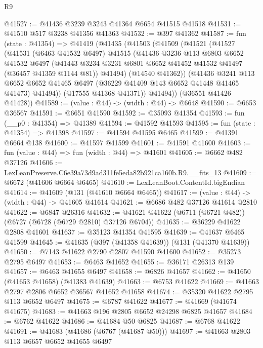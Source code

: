 \begin{lexlean}{R9}
\begin{coremodule}
@41527 := @41436 @3239 @3243 @41364 @6654 @41515 @41518
@41531 := @41510 @517 @3238 @41356 @41363
@41532 := @397 @41362
@41587 := fun (state : @41354) =>
  @41419
    (@41435
      (@41503
        (@41509
          (@41521
            (@41527
              (@41531
                (@6463 @41532 @6497)
                @41515
                (@41436
                  @3236
                  @113
                  @6803
                  @6652
                  @41532
                  @6497
                  (@41443 @3234 @3231 @6801 @6652 @41452 @41532 @41497 (@36457 @41359 @1144 @81))
                  @41494)
                (@14540 @41362))
              (@41436
                @3241
                @113
                @6652
                @6652
                @41465
                @6497
                (@36229 @41409 @143 @6652 @41448 @41465 @41473)
                @41494))
            (@17555 @41368 @41371))
          @41494))
      (@36551 @41426 @41428))
@41589 := (value : @44) -> (width : @44) -> @6648
@41590 := @6653 @36567
@41591 := @6651 @41590
@41592 := @35093 @41354
@41593 := fun (__p0 : @41354) => @41389
@41594 := @41592 @41593
@41595 := fun (state : @41354) => @41398
@41597 := @41594 @41595 @6465
@41599 := @41391 @6664 @138
@41600 := @41597 @41599
@41601 := @41591 @41600
@41603 := fun (value : @44) => fun (width : @44) => @41601
@41605 := @6662 @482 @37126
@41606 := LexLeanPreserve.C6e39a73d9ad311fe5eda82b921ca160b.R9.__fits_13
@41609 := @6672 (@41606 @6664 @6465)
@41610 := LexLeanBoot.ContentId.bigEndian
@41614 := @41609 (@131 (@41610 @6664 @6465))
@41617 := (value : @44) -> (width : @44) -> @41605 @41614
@41621 := @6686 @482 @37126 @41614 @2810
@41622 := @6847 @26316
@41632 := @41621 @41622 (@6711 (@6721 @482)) (@6727 (@6728 (@6729 @2810) @37126 @6704))
@41635 := @36229 @41622 @2808 @41601
@41637 := @35123 @41354 @41595
@41639 := @41637 @6465 @41599
@41645 := @41635 (@397 (@41358 @41639)) (@131 (@41370 @41639))
@41650 := @7143 @41622 @2790 @2807 @41590 @41600
@41652 := @35273 @2795 @6497
@41653 := @6463 @41652
@41655 := @36171 @26313 @139
@41657 := @6463 @41655 @6497
@41658 := @6826 @41657
@41662 := @41650 (@41653 @41658) (@41383 @41639)
@41663 := @6753 @41622
@41669 := @41663 @2797 @2806 @6652 @36567 @41652 @41658
@41674 := @35320 @41622 @2795 @113 @6652 @6497
@41675 := @6787 @41622
@41677 := @41669 (@41674 @41675)
@41683 := @41663 @196 @2805 @6652 @24298 @6825 @41657
@41684 := @6762 @41622
@41686 := @41684 @50 @6825
@41687 := @6768 @41622
@41691 := @41683 (@41686 (@6767 (@41687 @50)))
@41697 := @41663 @2803 @113 @6657 @6652 @41655 @6497

\end{coremodule}
\end{lexlean}
